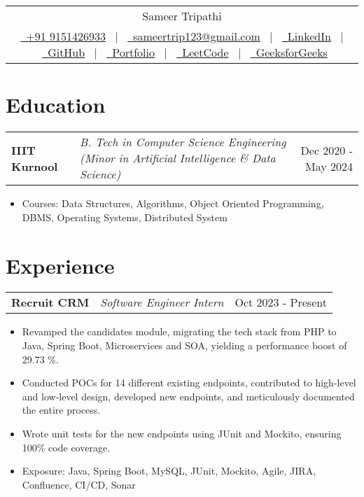 \documentclass[a4paper,10pt]{article}
\makeatletter
\newenvironment{joblong}[3]
    {
    \begin{tabularx}{\linewidth}{@{}l X r@{}}
    \textbf{#1} & \textit{#2} &  #3 \\[3pt]
    \end{tabularx}
    \begin{minipage}[t]{\linewidth}
    \begin{itemize}[nosep,after=\strut, leftmargin=1em, itemsep=2pt,label=--]
    }
    {
    \end{itemize}
    \end{minipage}    
    }
\makeatother
\begin{document}
\pagestyle{empty} 


\begin{tabularx}{\linewidth}{@{} C @{}}
\Huge{Sameer Tripathi} \\[8pt]
\href{tel:+919151426933}{\ +91 9151426933} \ $|$ \
\href{mailto:sameertrip123@gmail.com}{\ sameertrip123@gmail.com} \ $|$ \
\href{https://linkedin.com/in/sameertri039}{\ LinkedIn} \ $|$ \ 
\href{https://github.com/sameertrip123}{\ GitHub} \ $|$ \ 
\href{https://sameertrip123.github.io/portfolio/}{\ Portfolio}  \ $|$ \ 
\href{https://leetcode.com/u/sameertri039/}{\ LeetCode} \ $|$ \
\href{https://www.geeksforgeeks.org/user/sameertri039/}{\ GeeksforGeeks}  \\
\end{tabularx}


\section{Education}
\vspace{-4pt}
\begin{joblong}{IIIT Kurnool}{B. Tech in Computer Science Engineering {\footnotesize \textit{(Minor in Artificial Intelligence \& Data Science)}}}{Dec 2020 - May 2024}
    \item Courses: Data Structures, Algorithms, Object Oriented Programming, DBMS, Operating Systems, Distributed System
\end{joblong}
\vspace{-16pt}

\section{Experience}
\vspace{-4pt}
\begin{joblong}{Recruit CRM}{Software Engineer Intern}{Oct 2023 - Present}
    \item Revamped the candidates module, migrating the tech stack from PHP to Java, Spring Boot, Microservices and SOA, yielding a performance boost of 29.73 \%.
    \item Conducted POCs for 14 different existing endpoints, contributed to high-level and low-level design, developed new endpoints, and meticulously documented the entire process.
    \item Wrote unit tests for the new endpoints using JUnit and Mockito, ensuring 100\% code coverage.
    \item Exposure: Java, Spring Boot, MySQL, JUnit, Mockito, Agile, JIRA, Confluence, CI/CD, Sonar
\end{joblong}
\end{document}
